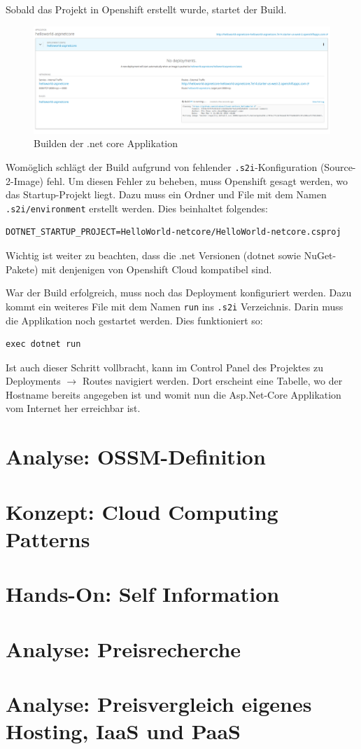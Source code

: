 \documentclass[12pt,a4paper]{article}
\begin{document}
Sobald das Projekt in Openshift erstellt wurde, startet der Build. 
\begin{figure}[h]
	\centering
	\includegraphics[width=0.7\linewidth]{img/os-building}
	\caption{Builden der .net core Applikation}
	\label{fig:os-building}
\end{figure}
Womöglich schlägt der Build aufgrund von fehlender \texttt{.s2i}-Konfiguration (Source-2-Image) fehl. Um diesen Fehler zu beheben, muss Openshift gesagt werden, wo das Startup-Projekt liegt. Dazu muss ein Ordner und File mit dem Namen \texttt{.s2i/environment} erstellt werden. Dies beinhaltet folgendes:
\begin{lstlisting}[breaklines=true]
DOTNET_STARTUP_PROJECT=HelloWorld-netcore/HelloWorld-netcore.csproj
\end{lstlisting}
Wichtig ist weiter zu beachten, dass die .net Versionen (dotnet sowie NuGet-Pakete) mit denjenigen von Openshift Cloud kompatibel sind. 

War der Build erfolgreich, muss noch das Deployment konfiguriert werden. Dazu kommt ein weiteres File mit dem Namen \texttt{run} ins \texttt{.s2i} Verzeichnis. Darin muss die Applikation noch gestartet werden. Dies funktioniert so:
\begin{lstlisting}
exec dotnet run
\end{lstlisting}
Ist auch dieser Schritt vollbracht, kann im Control Panel des Projektes zu Deployments $\rightarrow$ Routes navigiert werden. Dort erscheint eine Tabelle, wo der Hostname bereits angegeben ist und womit nun die Asp.Net-Core Applikation vom Internet her erreichbar ist.
\section{Analyse: OSSM-Definition}

\section{Konzept: Cloud Computing Patterns}

\section{Hands-On: Self Information}

\section{Analyse: Preisrecherche}

\section{Analyse: Preisvergleich eigenes Hosting, IaaS und PaaS}
\end{document}
